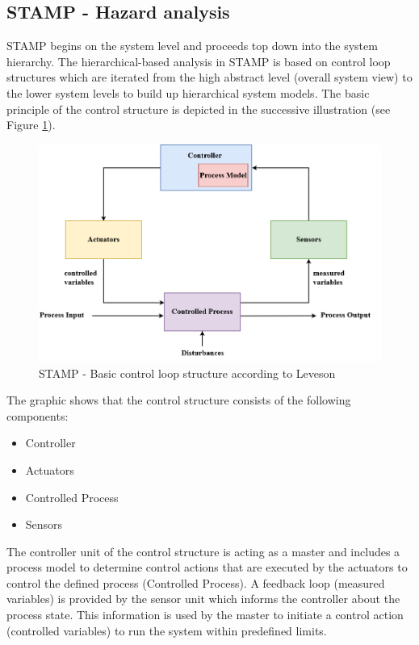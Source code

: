 \documentclass[review]{elsarticle}
\begin{document}
\subsection{STAMP - Hazard analysis}
STAMP begins on the system level and proceeds top down into the system hierarchy. The hierarchical-based analysis in STAMP is based on control loop structures which are iterated from the high abstract level (overall system view) to the lower system levels to build up hierarchical system models. The basic principle of the control structure is depicted in the successive illustration (see Figure \ref{fig:STAMPOverview}). 
\begin{figure}[!ht]
	\centering
	\includegraphics[scale=0.36]{images/STAMP_OVERVIEW}
	\caption[STAMP - Basic control loop structure]{STAMP - Basic control loop structure according to Leveson \cite{leveson2011engineering}}
	\label{fig:STAMPOverview}
\end{figure}
 
The graphic shows that the control structure consists of the following components:
\begin{itemize}
	\item Controller
	\item Actuators
	\item Controlled Process
	\item Sensors
\end{itemize}
The controller unit of the control structure is acting as a master and includes a process model to determine control actions that are executed by the actuators to control the defined process (Controlled Process). A feedback loop (measured variables) is provided by the sensor unit which informs the controller about the process state. This information is used by the master to initiate a control action (controlled variables) to run the system within predefined limits.
\end{document}
